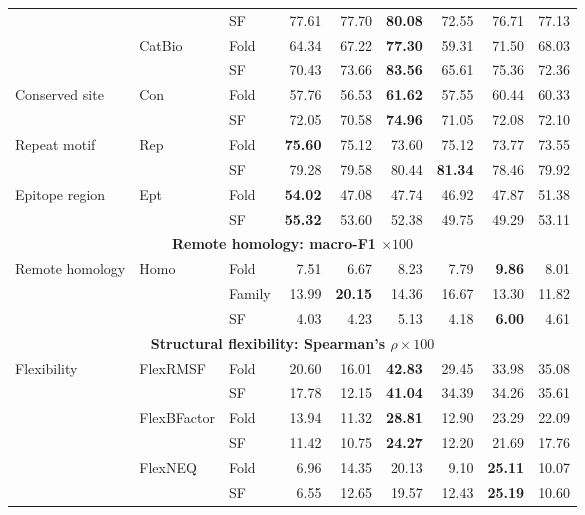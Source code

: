 \begin{table}[p]
{\begin{tabular}{@{}lllr@{\hspace{6pt}}rr@{\hspace{6pt}}rrr@{}}
 &  & SF & 77.61 & 77.70 & \textbf{80.08} & 72.55 & 76.71 & 77.13 \\
 & \multirow{2}{*}{CatBio} & Fold & 64.34 & 67.22 & \textbf{77.30} & 59.31 & 71.50 & 68.03 \\
 &  & SF & 70.43 & 73.66 & \textbf{83.56} & 65.61 & 75.36 & 72.36 \\
\multirow{2}{*}{Conserved site} & \multirow{2}{*}{Con} & Fold & 57.76 & 56.53 & \textbf{61.62} & 57.55 & 60.44 & 60.33 \\
 &  & SF & 72.05 & 70.58 & \textbf{74.96} & 71.05 & 72.08 & 72.10 \\
\multirow{2}{*}{Repeat motif} & \multirow{2}{*}{Rep} & Fold & \textbf{75.60} & 75.12 & 73.60 & 75.12 & 73.77 & 73.55 \\
 &  & SF & 79.28 & 79.58 & 80.44 & \textbf{81.34} & 78.46 & 79.92 \\
\multirow{2}{*}{Epitope region} & \multirow{2}{*}{Ept} & Fold & \textbf{54.02} & 47.08 & 47.74 & 46.92 & 47.87 & 51.38 \\
 &  & SF & \textbf{55.32} & 53.60 & 52.38 & 49.75 & 49.29 & 53.11 \\
\midrule
\multicolumn{9}{c}{\textbf{Remote homology: macro-F1 $\times100$}} \\
\midrule
\multirow{3}{*}{Remote homology} & \multirow{3}{*}{Homo} & Fold & 7.51 & 6.67 & 8.23 & 7.79 & \textbf{9.86} & 8.01 \\
 &  & Family & 13.99 & \textbf{20.15} & 14.36 & 16.67 & 13.30 & 11.82 \\
 &  & SF & 4.03 & 4.23 & 5.13 & 4.18 & \textbf{6.00} & 4.61 \\
\midrule
\multicolumn{9}{c}{\textbf{Structural flexibility: Spearman's $\rho\times100$}} \\
\midrule
\multirow{6}{*}{Flexibility} & \multirow{2}{*}{FlexRMSF} & Fold & 20.60 & 16.01 & \textbf{42.83} & 29.45 & 33.98 & 35.08 \\
 &  & SF & 17.78 & 12.15 & \textbf{41.04} & 34.39 & 34.26 & 35.61 \\
 & \multirow{2}{*}{FlexBFactor} & Fold & 13.94 & 11.32 & \textbf{28.81} & 12.90 & 23.29 & 22.09 \\
 &  & SF & 11.42 & 10.75 & \textbf{24.27} & 12.20 & 21.69 & 17.76 \\
 & \multirow{2}{*}{FlexNEQ} & Fold & 6.96 & 14.35 & 20.13 & 9.10 & \textbf{25.11} & 10.07 \\
 &  & SF & 6.55 & 12.65 & 19.57 & 12.43 & \textbf{25.19} & 10.60 \\
\bottomrule
\end{tabular}%
}
\stbworkshopfit
\end{table}

